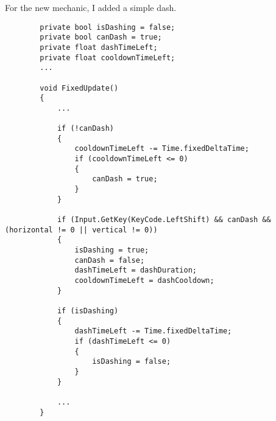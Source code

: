    For the new mechanic, I added a simple dash.
    \begin{verbatim}
        private bool isDashing = false;
        private bool canDash = true;
        private float dashTimeLeft;
        private float cooldownTimeLeft;
        ...

        void FixedUpdate()
        {
            ...

            if (!canDash)
            {
                cooldownTimeLeft -= Time.fixedDeltaTime;
                if (cooldownTimeLeft <= 0)
                {
                    canDash = true;
                }
            }

            if (Input.GetKey(KeyCode.LeftShift) && canDash && (horizontal != 0 || vertical != 0))
            {
                isDashing = true;
                canDash = false;
                dashTimeLeft = dashDuration;
                cooldownTimeLeft = dashCooldown;
            }

            if (isDashing)
            {
                dashTimeLeft -= Time.fixedDeltaTime;
                if (dashTimeLeft <= 0)
                {
                    isDashing = false;
                }
            }

            ...
        }

    \end{verbatim}